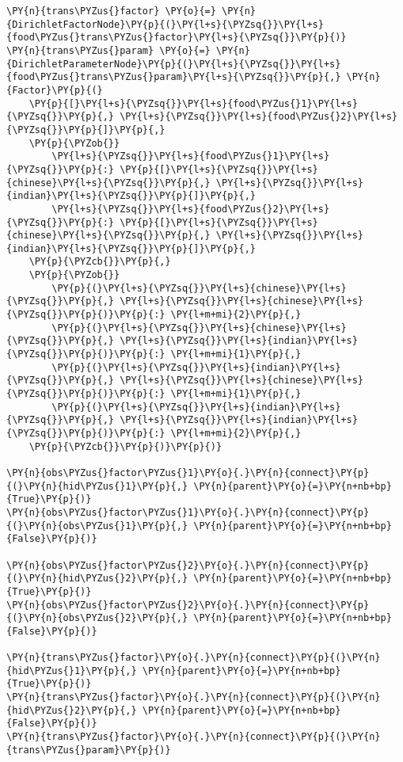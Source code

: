 \begin{example}
\begin{Verbatim}[commandchars=\\\{\}, fontsize=\relsize{-1}]
\PY{n}{trans\PYZus{}factor} \PY{o}{=} \PY{n}{DirichletFactorNode}\PY{p}{(}\PY{l+s}{\PYZsq{}}\PY{l+s}{food\PYZus{}trans\PYZus{}factor}\PY{l+s}{\PYZsq{}}\PY{p}{)}
\PY{n}{trans\PYZus{}param} \PY{o}{=} \PY{n}{DirichletParameterNode}\PY{p}{(}\PY{l+s}{\PYZsq{}}\PY{l+s}{food\PYZus{}trans\PYZus{}param}\PY{l+s}{\PYZsq{}}\PY{p}{,} \PY{n}{Factor}\PY{p}{(}
    \PY{p}{[}\PY{l+s}{\PYZsq{}}\PY{l+s}{food\PYZus{}1}\PY{l+s}{\PYZsq{}}\PY{p}{,} \PY{l+s}{\PYZsq{}}\PY{l+s}{food\PYZus{}2}\PY{l+s}{\PYZsq{}}\PY{p}{]}\PY{p}{,}
    \PY{p}{\PYZob{}}
        \PY{l+s}{\PYZsq{}}\PY{l+s}{food\PYZus{}1}\PY{l+s}{\PYZsq{}}\PY{p}{:} \PY{p}{[}\PY{l+s}{\PYZsq{}}\PY{l+s}{chinese}\PY{l+s}{\PYZsq{}}\PY{p}{,} \PY{l+s}{\PYZsq{}}\PY{l+s}{indian}\PY{l+s}{\PYZsq{}}\PY{p}{]}\PY{p}{,}
        \PY{l+s}{\PYZsq{}}\PY{l+s}{food\PYZus{}2}\PY{l+s}{\PYZsq{}}\PY{p}{:} \PY{p}{[}\PY{l+s}{\PYZsq{}}\PY{l+s}{chinese}\PY{l+s}{\PYZsq{}}\PY{p}{,} \PY{l+s}{\PYZsq{}}\PY{l+s}{indian}\PY{l+s}{\PYZsq{}}\PY{p}{]}\PY{p}{,}
    \PY{p}{\PYZcb{}}\PY{p}{,}
    \PY{p}{\PYZob{}}
        \PY{p}{(}\PY{l+s}{\PYZsq{}}\PY{l+s}{chinese}\PY{l+s}{\PYZsq{}}\PY{p}{,} \PY{l+s}{\PYZsq{}}\PY{l+s}{chinese}\PY{l+s}{\PYZsq{}}\PY{p}{)}\PY{p}{:} \PY{l+m+mi}{2}\PY{p}{,}
        \PY{p}{(}\PY{l+s}{\PYZsq{}}\PY{l+s}{chinese}\PY{l+s}{\PYZsq{}}\PY{p}{,} \PY{l+s}{\PYZsq{}}\PY{l+s}{indian}\PY{l+s}{\PYZsq{}}\PY{p}{)}\PY{p}{:} \PY{l+m+mi}{1}\PY{p}{,}
        \PY{p}{(}\PY{l+s}{\PYZsq{}}\PY{l+s}{indian}\PY{l+s}{\PYZsq{}}\PY{p}{,} \PY{l+s}{\PYZsq{}}\PY{l+s}{chinese}\PY{l+s}{\PYZsq{}}\PY{p}{)}\PY{p}{:} \PY{l+m+mi}{1}\PY{p}{,}
        \PY{p}{(}\PY{l+s}{\PYZsq{}}\PY{l+s}{indian}\PY{l+s}{\PYZsq{}}\PY{p}{,} \PY{l+s}{\PYZsq{}}\PY{l+s}{indian}\PY{l+s}{\PYZsq{}}\PY{p}{)}\PY{p}{:} \PY{l+m+mi}{2}\PY{p}{,}
    \PY{p}{\PYZcb{}}\PY{p}{)}\PY{p}{)}

\PY{n}{obs\PYZus{}factor\PYZus{}1}\PY{o}{.}\PY{n}{connect}\PY{p}{(}\PY{n}{hid\PYZus{}1}\PY{p}{,} \PY{n}{parent}\PY{o}{=}\PY{n+nb+bp}{True}\PY{p}{)}
\PY{n}{obs\PYZus{}factor\PYZus{}1}\PY{o}{.}\PY{n}{connect}\PY{p}{(}\PY{n}{obs\PYZus{}1}\PY{p}{,} \PY{n}{parent}\PY{o}{=}\PY{n+nb+bp}{False}\PY{p}{)}

\PY{n}{obs\PYZus{}factor\PYZus{}2}\PY{o}{.}\PY{n}{connect}\PY{p}{(}\PY{n}{hid\PYZus{}2}\PY{p}{,} \PY{n}{parent}\PY{o}{=}\PY{n+nb+bp}{True}\PY{p}{)}
\PY{n}{obs\PYZus{}factor\PYZus{}2}\PY{o}{.}\PY{n}{connect}\PY{p}{(}\PY{n}{obs\PYZus{}2}\PY{p}{,} \PY{n}{parent}\PY{o}{=}\PY{n+nb+bp}{False}\PY{p}{)}

\PY{n}{trans\PYZus{}factor}\PY{o}{.}\PY{n}{connect}\PY{p}{(}\PY{n}{hid\PYZus{}1}\PY{p}{,} \PY{n}{parent}\PY{o}{=}\PY{n+nb+bp}{True}\PY{p}{)}
\PY{n}{trans\PYZus{}factor}\PY{o}{.}\PY{n}{connect}\PY{p}{(}\PY{n}{hid\PYZus{}2}\PY{p}{,} \PY{n}{parent}\PY{o}{=}\PY{n+nb+bp}{False}\PY{p}{)}
\PY{n}{trans\PYZus{}factor}\PY{o}{.}\PY{n}{connect}\PY{p}{(}\PY{n}{trans\PYZus{}param}\PY{p}{)}
\end{Verbatim}
\end{example}


